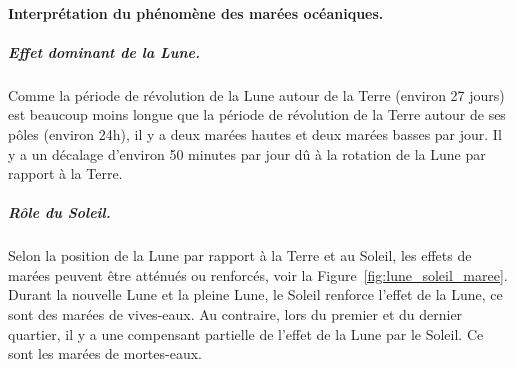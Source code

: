         \paragraph{Interprétation du phénomène des marées océaniques.}
            \subparagraph{Effet dominant de la Lune.}

                Comme la période de révolution de la Lune autour de la Terre (environ 27 jours) est beaucoup moins longue que la période de révolution de la Terre autour de ses pôles (environ 24h), il y a deux marées hautes et deux marées basses par jour. Il y a un décalage d'environ 50 minutes par jour dû à la rotation de la Lune par rapport à la Terre.
            
            \subparagraph{Rôle du Soleil.}

                Selon la position de la Lune par rapport à la Terre et au Soleil, les effets de marées peuvent être atténués ou renforcés, voir la Figure~\ref{fig:lune_soleil_maree}. Durant la nouvelle Lune et la pleine Lune, le Soleil renforce l'effet de la Lune, ce sont des marées de vives-eaux. Au contraire, lors du premier et du dernier quartier, il y a une compensant partielle de l'effet de la Lune par le Soleil. Ce sont les marées de mortes-eaux.

